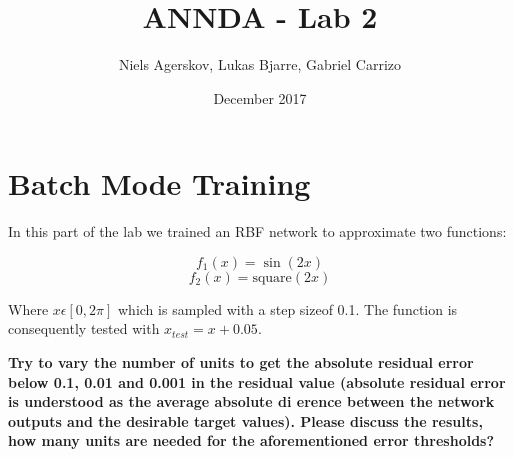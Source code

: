 \documentclass{article}
\title{ANNDA - Lab 2}
\author{Niels Agerskov, Lukas Bjarre, Gabriel Carrizo}
\date{December 2017}
\begin{document}
\maketitle
\pagebreak

\section{Batch Mode Training}

In this part of the lab we trained an RBF network to approximate two functions:

\begin{equation}
  f_1(x) = \sin(2x)
\end{equation}
\begin{equation}
  f_2(x) = \mathrm{square}(2x)
\end{equation}

Where $x \epsilon [0, 2\pi]$ which is sampled with a step sizeof 0.1. The function is consequently tested with $x_{test} = x+0.05$.

\textbf{Try to vary the number of units to get the absolute residual error below 0.1, 0.01 and 0.001 in the residual value (absolute residual error is understood as the average absolute di erence between the network outputs and the desirable target values). Please discuss the results, how many units are needed for the aforementioned error thresholds?}
\end{document}
